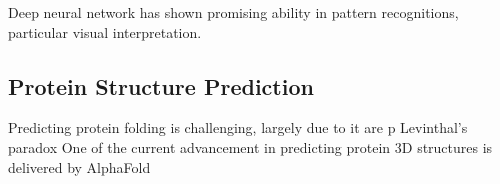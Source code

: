 Deep neural network has shown promising ability in pattern recognitions, particular visual interpretation.
\par 

\subsection{Protein Structure Prediction}
Predicting protein folding is challenging, largely due to it  are p Levinthal's paradox One of the current advancement in predicting protein 3D structures is delivered by AlphaFold